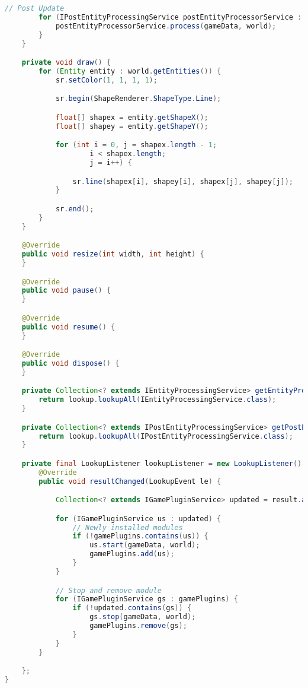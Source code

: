 \begin{lstlisting}[caption={dk.sdu.mmmi.cbse.core.main.Game.java}, label={lst:net1:Game.java}, language=java, firstnumber=22]
        // Post Update
        for (IPostEntityProcessingService postEntityProcessorService : getPostEntityProcessingServices()) {
            postEntityProcessorService.process(gameData, world);
        }
    }

    private void draw() {
        for (Entity entity : world.getEntities()) {
            sr.setColor(1, 1, 1, 1);

            sr.begin(ShapeRenderer.ShapeType.Line);

            float[] shapex = entity.getShapeX();
            float[] shapey = entity.getShapeY();

            for (int i = 0, j = shapex.length - 1;
                    i < shapex.length;
                    j = i++) {

                sr.line(shapex[i], shapey[i], shapex[j], shapey[j]);
            }

            sr.end();
        }
    }

    @Override
    public void resize(int width, int height) {
    }

    @Override
    public void pause() {
    }

    @Override
    public void resume() {
    }

    @Override
    public void dispose() {
    }

    private Collection<? extends IEntityProcessingService> getEntityProcessingServices() {
        return lookup.lookupAll(IEntityProcessingService.class);
    }

    private Collection<? extends IPostEntityProcessingService> getPostEntityProcessingServices() {
        return lookup.lookupAll(IPostEntityProcessingService.class);
    }

    private final LookupListener lookupListener = new LookupListener() {
        @Override
        public void resultChanged(LookupEvent le) {

            Collection<? extends IGamePluginService> updated = result.allInstances();

            for (IGamePluginService us : updated) {
                // Newly installed modules
                if (!gamePlugins.contains(us)) {
                    us.start(gameData, world);
                    gamePlugins.add(us);
                }
            }

            // Stop and remove module
            for (IGamePluginService gs : gamePlugins) {
                if (!updated.contains(gs)) {
                    gs.stop(gameData, world);
                    gamePlugins.remove(gs);
                }
            }
        }

    };
}
\end{lstlisting}
